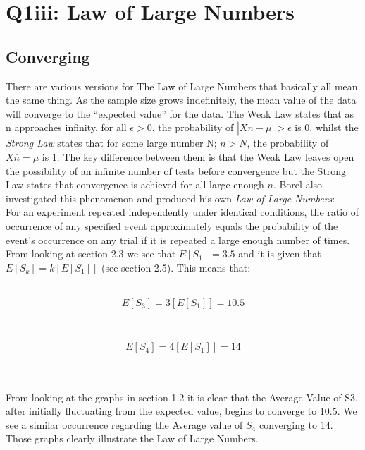 \documentclass[12pt]{article}
\begin{document}
\section{Q1iii: Law of Large Numbers}
\subsection{Converging}
There are various versions for The Law of Large Numbers that basically all mean the same thing. As the sample size grows indefinitely, the mean value of the data will converge to the “expected value” for the data.
The Weak Law states that as n approaches infinity, for all $\epsilon > 0$, the probability of $|\bar{X}\bar{n} - \mu|> \epsilon$ is 0, whilst the \emph{Strong Law} states that for some large number N; $n>N$, the probability of $\bar{X}\bar{n} = \mu$ is 1. The key difference between them is that the Weak Law leaves open the possibility of an infinite number of tests before convergence but the Strong Law states that convergence is achieved for all large enough $n$. Borel also investigated this phenomenon and produced his own \emph{Law of Large Numbers}:\\
For an experiment repeated independently under identical conditions, the ratio of occurrence of any specified event approximately equals the probability of the event's occurrence on any trial if it is repeated a large enough number of times.
\\
From looking at section 2.3 we see that $E[S_1] = 3.5$ and it is given that $E[S_k]=k[E[S_1]]$ (see section 2.5). This means that:
\\\\
\begin{minipage}{0.5\textwidth}
\begin{flushleft} 
$$E[S_3]=3[E[S_1]]=10.5$$
\end{flushleft}
\end{minipage}
~
\begin{minipage}{0.5\textwidth}
\begin{flushleft} 
$$E[S_4]=4[E[S_1]]=14$$
\end{flushleft}
\end{minipage}
\\\\
From looking at the graphs in section 1.2 it is clear that the Average Value of S3, after initially fluctuating from the expected value, begins to converge to 10.5. We see a similar occurrence regarding the Average value of $S_4$ converging to 14. Those graphs clearly illustrate the Law of Large Numbers.
\end{document}
